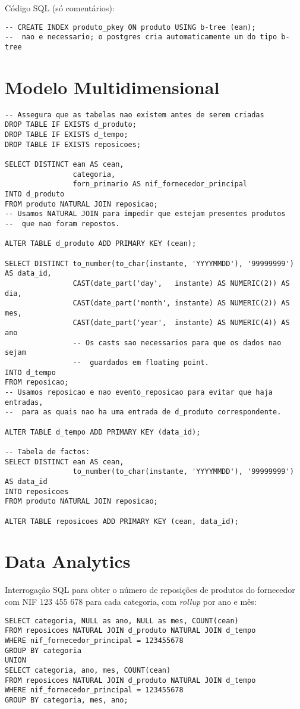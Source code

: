 \documentclass[12pt]{extarticle}
\begin{document}
\bigskip
\noindent Código SQL (só comentários):
\begin{lstlisting}
-- CREATE INDEX produto_pkey ON produto USING b-tree (ean);
--  nao e necessario; o postgres cria automaticamente um do tipo b-tree
\end{lstlisting}

\section{Modelo Multidimensional}

\begin{lstlisting}
-- Assegura que as tabelas nao existem antes de serem criadas
DROP TABLE IF EXISTS d_produto;
DROP TABLE IF EXISTS d_tempo;
DROP TABLE IF EXISTS reposicoes;

SELECT DISTINCT ean AS cean,
                categoria,
                forn_primario AS nif_fornecedor_principal
INTO d_produto
FROM produto NATURAL JOIN reposicao;
-- Usamos NATURAL JOIN para impedir que estejam presentes produtos
--  que nao foram repostos.

ALTER TABLE d_produto ADD PRIMARY KEY (cean);

SELECT DISTINCT to_number(to_char(instante, 'YYYYMMDD'), '99999999') AS data_id,
                CAST(date_part('day',   instante) AS NUMERIC(2)) AS dia,
                CAST(date_part('month', instante) AS NUMERIC(2)) AS mes,
                CAST(date_part('year',  instante) AS NUMERIC(4)) AS ano
                -- Os casts sao necessarios para que os dados nao sejam
                --  guardados em floating point.
INTO d_tempo 
FROM reposicao;
-- Usamos reposicao e nao evento_reposicao para evitar que haja entradas,
--  para as quais nao ha uma entrada de d_produto correspondente.

ALTER TABLE d_tempo ADD PRIMARY KEY (data_id);

-- Tabela de factos:
SELECT DISTINCT ean AS cean,
                to_number(to_char(instante, 'YYYYMMDD'), '99999999') AS data_id
INTO reposicoes
FROM produto NATURAL JOIN reposicao;

ALTER TABLE reposicoes ADD PRIMARY KEY (cean, data_id);
\end{lstlisting}

\section{Data Analytics}

Interrogação SQL   para   obter   o   número   de   reposições   de   produtos   do   fornecedor   com   NIF   123   455   678   para cada   categoria,   com   \textit{rollup}   por   ano   e   mês:\par

\begin{lstlisting}
SELECT categoria, NULL as ano, NULL as mes, COUNT(cean)
FROM reposicoes NATURAL JOIN d_produto NATURAL JOIN d_tempo
WHERE nif_fornecedor_principal = 123455678
GROUP BY categoria
UNION
SELECT categoria, ano, mes, COUNT(cean)
FROM reposicoes NATURAL JOIN d_produto NATURAL JOIN d_tempo
WHERE nif_fornecedor_principal = 123455678
GROUP BY categoria, mes, ano;
\end{lstlisting}
\end{document}
